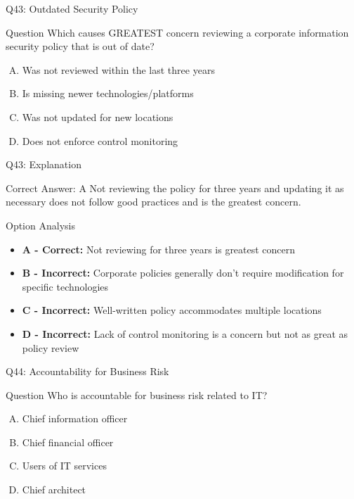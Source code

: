 \documentclass{beamer}
\begin{document}
	\begin{frame}{Q43: Outdated Security Policy}
		\begin{block}{Question}
			Which causes GREATEST concern reviewing a corporate information security policy that is out of date?
		\end{block}
		\begin{enumerate}[(A)]
			\item Was not reviewed within the last three years
			\item Is missing newer technologies/platforms
			\item Was not updated for new locations
			\item Does not enforce control monitoring
		\end{enumerate}
	\end{frame}
	
	\begin{frame}{Q43: Explanation}
		\begin{block}{Correct Answer: A}
			Not reviewing the policy for three years and updating it as necessary does not follow good practices and is the greatest concern.
		\end{block}
		\begin{block}{Option Analysis}
			\begin{itemize}
				\item \textbf{A - Correct:} Not reviewing for three years is greatest concern
				\item \textbf{B - Incorrect:} Corporate policies generally don't require modification for specific technologies
				\item \textbf{C - Incorrect:} Well-written policy accommodates multiple locations
				\item \textbf{D - Incorrect:} Lack of control monitoring is a concern but not as great as policy review
			\end{itemize}
		\end{block}
	\end{frame}
	
	\begin{frame}{Q44: Accountability for Business Risk}
		\begin{block}{Question}
			Who is accountable for business risk related to IT?
		\end{block}
		\begin{enumerate}[(A)]
			\item Chief information officer
			\item Chief financial officer
			\item Users of IT services
			\item Chief architect
		\end{enumerate}
	\end{frame}
	
\end{document}
